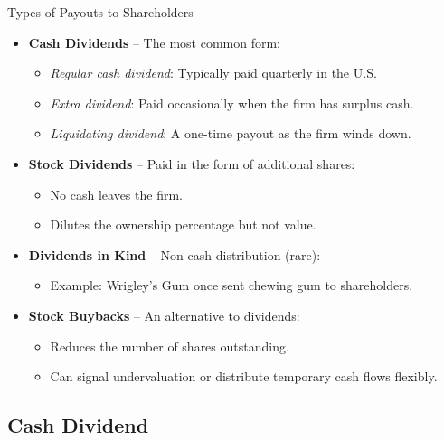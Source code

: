 \begin{frame}{Types of Payouts to Shareholders}
\footnotesize
\begin{itemize}
    \item \textbf{Cash Dividends} -- The most common form:
    \begin{itemize}
        \item \textit{Regular cash dividend}: Typically paid quarterly in the U.S.
        \item \textit{Extra dividend}: Paid occasionally when the firm has surplus cash.
        \item \textit{Liquidating dividend}: A one-time payout as the firm winds down.
    \end{itemize}

    \item \textbf{Stock Dividends} -- Paid in the form of additional shares:
    \begin{itemize}
        \item No cash leaves the firm.
        \item Dilutes the ownership percentage but not value.
    \end{itemize}

    \item \textbf{Dividends in Kind} -- Non-cash distribution (rare):
    \begin{itemize}
        \item Example: Wrigley's Gum once sent chewing gum to shareholders.
    \end{itemize}

    \item \textbf{Stock Buybacks} -- An alternative to dividends:
    \begin{itemize}
        \item Reduces the number of shares outstanding.
        \item Can signal undervaluation or distribute temporary cash flows flexibly.
    \end{itemize}
\end{itemize}
\end{frame}

\subsection{Cash Dividend}
